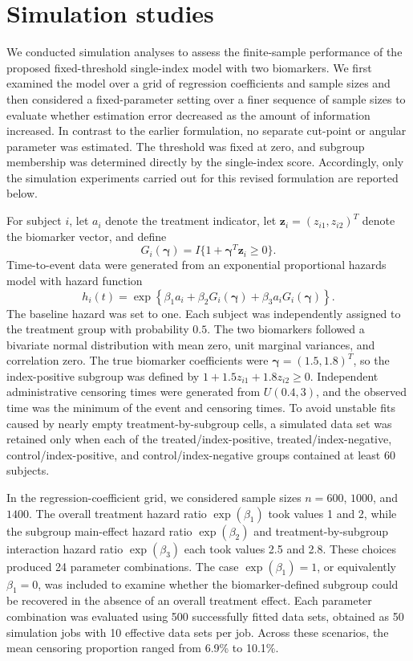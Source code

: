 \section{Simulation studies}
\label{simuStudy}

We conducted simulation analyses to assess the finite-sample performance of the proposed fixed-threshold single-index model with two biomarkers. We first examined the model over a grid of regression coefficients and sample sizes and then considered a fixed-parameter setting over a finer sequence of sample sizes to evaluate whether estimation error decreased as the amount of information increased. In contrast to the earlier formulation, no separate cut-point or angular parameter was estimated. The threshold was fixed at zero, and subgroup membership was determined directly by the single-index score. Accordingly, only the simulation experiments carried out for this revised formulation are reported below.

For subject $i$, let $a_i$ denote the treatment indicator, let $\mathbf z_i=(z_{i1},z_{i2})^{T}$ denote the biomarker vector, and define
\[
    G_i(\boldsymbol\gamma)
    = I\{1+\boldsymbol\gamma^{T}\mathbf z_i\geq 0\}.
\]
Time-to-event data were generated from an exponential proportional hazards model with hazard function
\begin{equation}
\label{eq:simModel}
    h_i(t)
    =
    \exp\left\{
        \beta_1 a_i
        +\beta_2G_i(\boldsymbol\gamma)
        +\beta_3a_iG_i(\boldsymbol\gamma)
    \right\}.
\end{equation}
The baseline hazard was set to one. Each subject was independently assigned to the treatment group with probability $0.5$. The two biomarkers followed a bivariate normal distribution with mean zero, unit marginal variances, and correlation zero. The true biomarker coefficients were $\boldsymbol\gamma=(1.5,1.8)^{T}$, so the index-positive subgroup was defined by $1+1.5z_{i1}+1.8z_{i2}\geq0$. Independent administrative censoring times were generated from $U(0.4,3)$, and the observed time was the minimum of the event and censoring times. To avoid unstable fits caused by nearly empty treatment-by-subgroup cells, a simulated data set was retained only when each of the treated/index-positive, treated/index-negative, control/index-positive, and control/index-negative groups contained at least 60 subjects.

In the regression-coefficient grid, we considered sample sizes $n=600$, $1000$, and $1400$. The overall treatment hazard ratio $\exp(\beta_1)$ took values 1 and 2, while the subgroup main-effect hazard ratio $\exp(\beta_2)$ and treatment-by-subgroup interaction hazard ratio $\exp(\beta_3)$ each took values 2.5 and 2.8. These choices produced 24 parameter combinations. The case $\exp(\beta_1)=1$, or equivalently $\beta_1=0$, was included to examine whether the biomarker-defined subgroup could be recovered in the absence of an overall treatment effect. Each parameter combination was evaluated using 500 successfully fitted data sets, obtained as 50 simulation jobs with 10 effective data sets per job. Across these scenarios, the mean censoring proportion ranged from 6.9\% to 10.1\%.

